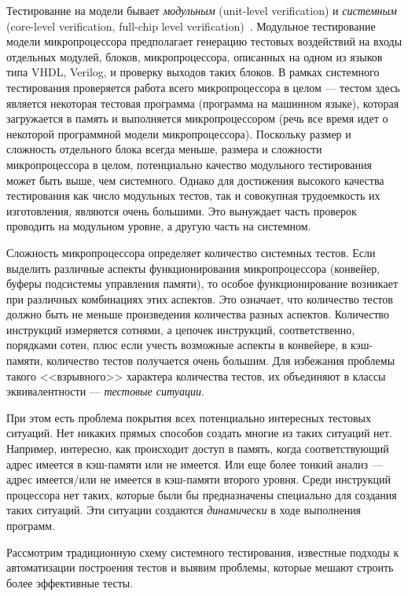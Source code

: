 \documentclass[14pt]{extreport}
\begin{document}
Тестирование на модели бывает \emph{модульным} (unit-level verification) и \emph{системным} (core-level verification, full-chip level verification)~\cite{UnitCoreLevel}. Модульное тестирование модели микропроцессора предполагает генерацию тестовых воздействий на входы отдельных модулей, блоков, микропроцессора, описанных на одном из языков типа VHDL, Verilog, и проверку выходов таких блоков. В рамках системного тестирования проверяется работа всего микропроцессора в целом --- тестом здесь является некоторая тестовая программа (программа на машинном языке), которая загружается в память и выполняется микропроцессором (речь все время идет о некоторой программной модели микропроцессора). Поскольку размер и сложность отдельного блока всегда меньше, размера и сложности микропроцессора в целом, потенциально качество модульного тестирования может быть выше, чем системного. Однако для достижения высокого качества тестирования как число модульных тестов, так и совокупная трудоемкость их изготовления, являются очень большими. Это вынуждает часть проверок проводить на модульном уровне, а другую часть на системном.

Сложность микропроцессора определяет количество системных тестов. Если выделить различные аспекты функционирования микропроцессора (конвейер, буферы подсистемы управления памяти), то особое функционирование возникает при различных комбинациях этих аспектов. Это означает, что количество тестов должно быть не меньше произведения количества разных аспектов. Количество инструкций измеряется сотнями, а цепочек инструкций, соответственно, порядками сотен, плюс если учесть возможные аспекты в конвейере, в кэш-памяти, количество тестов получается очень большим. Для избежания проблемы такого <<взрывного>> характера количества тестов, их объединяют в классы эквивалентности --- \emph{тестовые ситуации}.

При этом есть проблема покрытия всех потенциально интересных тестовых ситуаций. Нет никаких прямых способов создать многие из таких ситуаций нет. Например, интересно, как происходит доступ в память, когда соответствующий адрес имеется в кэш-памяти или не имеется. Или еще более тонкий анализ --- адрес имеется/или не имеется в кэш-памяти второго уровня. Среди инструкций процессора нет таких, которые были бы предназначены специально для создания таких ситуаций. Эти ситуации создаются \emph{динамически} в ходе выполнения программ.


Рассмотрим традиционную схему системного тестирования, известные подходы к автоматизации построения тестов и выявим проблемы, которые мешают строить более эффективные тесты.
\end{document}
